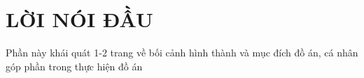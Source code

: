 \thispagestyle{empty}
\section*{LỜI NÓI ĐẦU}
Phần này khái quát 1-2 trang về bối cảnh hình thành và mục đích đồ án, cá nhân góp phần trong thực hiện đồ án